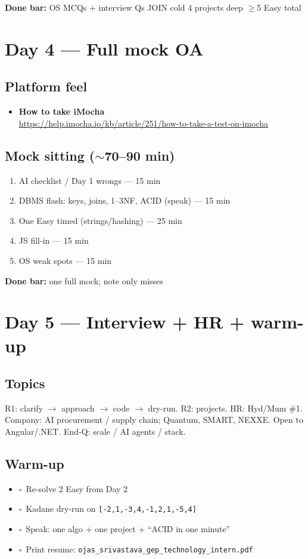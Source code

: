 \documentclass[a4paper,9pt]{extarticle}
\newcommand{\tick}{$\square$\ }
\newcommand{\Res}[2]{\textbf{#1}\\{\footnotesize\url{#2}}}
\begin{document}
\noindent\textbf{Done bar:} OS MCQs + interview Qs \textbar{} JOIN cold \textbar{} 4 projects deep \textbar{} $\geq$5 Easy total

\section{Day 4 --- Full mock OA}
\subsection{Platform feel}
\begin{itemize}
  \item \Res{How to take iMocha}{https://help.imocha.io/kb/article/251/how-to-take-a-test-on-imocha}
\end{itemize}

\subsection{Mock sitting ($\sim$70--90 min)}
\begin{enumerate}
  \item AI checklist / Day 1 wrongs --- 15 min
  \item DBMS flash: keys, joins, 1--3NF, ACID (speak) --- 15 min
  \item One Easy timed (strings/hashing) --- 25 min
  \item JS fill-in --- 15 min
  \item OS weak spots --- 15 min
\end{enumerate}

\noindent\textbf{Done bar:} one full mock; note only misses

\section{Day 5 --- Interview + HR + warm-up}
\subsection{Topics}
R1: clarify $\to$ approach $\to$ code $\to$ dry-run. R2: projects.
HR: Hyd/Mum \#1. Company: AI procurement / supply chain; Quantum, SMART, NEXXE.
Open to Angular/.NET. End-Q: scale / AI agents / stack.

\subsection{Warm-up}
\begin{itemize}
  \item \tick Re-solve 2 Easy from Day 2
  \item \tick Kadane dry-run on \texttt{[-2,1,-3,4,-1,2,1,-5,4]}
  \item \tick Speak: one algo + one project + ``ACID in one minute''
  \item \tick Print resume: \texttt{ojas\_srivastava\_gep\_technology\_intern.pdf}
\end{itemize}
\end{document}
